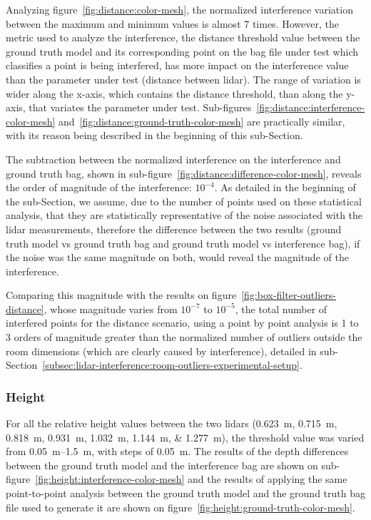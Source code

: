 Analyzing figure~\ref{fig:distance:color-mesh}, the normalized interference variation between the maximum and minimum values is almost 7 times. However, the metric used to analyze the interference, the distance threshold value between the ground truth model and its corresponding point on the bag file under test which classifies a point is being interfered, has more impact on the interference value than the parameter under test (distance between \ac{lidar}). The range of variation is wider along the x-axis, which contains the distance threshold, than along the y-axis, that variates the parameter under test. Sub-figures~\ref{fig:distance:interference-color-mesh} and~\ref{fig:distance:ground-truth-color-mesh} are practically similar, with its reason being described in the beginning of this sub-Section.

The subtraction between the normalized interference on the interference and ground truth bag, shown in sub-figure~\ref{fig:distance:difference-color-mesh}, reveals the order of magnitude of the interference: $10^{-4}$. As detailed in the beginning of the sub-Section, we assume, due to the number of points used on these statistical analysis, that they are statistically representative of the noise associated with the \ac{lidar} measurements, therefore the difference between the two results (ground truth model vs ground truth bag and ground truth model vs interference bag), if the noise was the same magnitude on both, would reveal the magnitude of the interference. 

Comparing this magnitude with the results on figure~\ref{fig:box-filter-outliers-distance}, whose magnitude varies from $10^{-7}$ to $10^{-5}$, the total number of interfered points for the distance scenario, using a point by point analysis is 1 to 3 orders of magnitude greater than the normalized number of outliers outside the room dimensions (which are clearly caused by interference), detailed in sub-Section~\ref{subsec:lidar-interference:room-outliers-experimental-setup}.

\subsubsection{Height}
For all the relative height values between the two \acp{lidar} (\SIlist[list-units=single]{0.623; 0.715; 0.818; 0.931; 1.032; 1.144; 1.277}{\meter}), the threshold value was varied from \SIrange{0.05}{1.5}{\meter}, with steps of \SI{0.05}{\meter}. The results of the depth differences between the ground truth model and the interference bag are shown on sub-figure~\ref{fig:height:interference-color-mesh} and the results of applying the same point-to-point analysis between the ground truth model and the ground truth bag file used to generate it are shown on figure~\ref{fig:height:ground-truth-color-mesh}.


